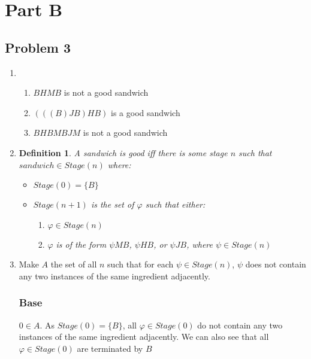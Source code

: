 \documentclass[a4paper]{article}
\newtheorem{definition}{Definition}
\newcommand{\SET}[1]{\{ {#1} \}}
\begin{document}
\section*{Part B}

\subsection*{Problem 3}

\begin{enumerate}
    \item \begin{enumerate}
        \item $BHMB$ is not a good sandwich
        \item $(((B)JB)HB)$ is a good sandwich
        \item $BHBMBJM$ is not a good sandwich
    
    \end{enumerate}

    \item \begin{definition}
    A sandwich is good iff there is some stage $n$ such that $sandwich \in Stage(n)$ where:

    \begin{itemize}
        \item $Stage(0) = \{ B \}$
        \item $Stage(n + 1)$ is the set of $\varphi$ such that either:
        \begin{enumerate}
            \item $\varphi \in Stage(n)$
            \item $\varphi$ is of the form $\psi MB$, $\psi HB$, or $\psi JB$, where $\psi \in Stage(n)$
        \end{enumerate}
    \end{itemize}

    \end{definition}

    \item Make $A$ the set of all $n$ such that for each $\psi \in Stage(n)$, $\psi$ does not contain any two instances of the same ingredient adjacently.

    \subsubsection*{Base} $0 \in A$. As $Stage(0) = \SET{B}$, all $\varphi \in Stage(0)$ do not contain any two instances of the same ingredient adjacently. We can also see that all $\varphi \in Stage(0)$ are terminated by $B$


\end{enumerate}
\end{document}
